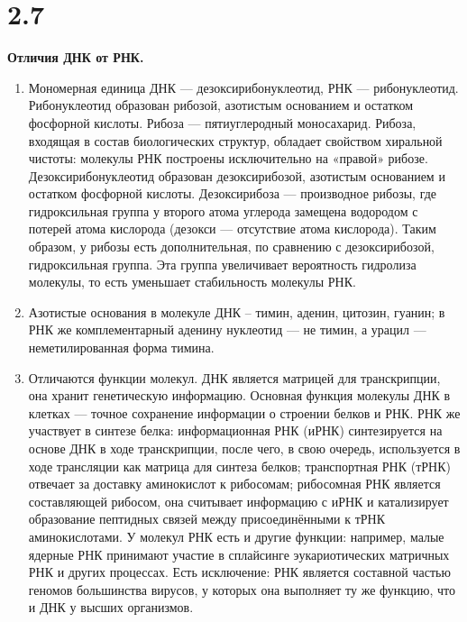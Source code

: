 \documentclass[a4paper,14pt]{article}
\begin{document}
\section*{2.7}

\begin{center}
	\LARGE{\textbf{Отличия ДНК от РНК.}}\\
\end{center}

\begin{enumerate}
\item Мономерная единица ДНК --- дезоксирибонуклеотид, РНК --- рибонуклеотид.
\newline
Рибонуклеотид образован рибозой, азотистым основанием и остатком фосфорной кислоты. Рибоза --- пятиуглеродный моносахарид. Рибоза, входящая в состав биологических структур, обладает свойством хиральной чистоты: молекулы РНК построены исключительно на «правой» рибозе.
\newline
Дезоксирибонуклеотид образован дезоксирибозой, азотистым основанием и остатком фосфорной кислоты. Дезоксирибоза --- производное рибозы, где гидроксильная группа у второго атома углерода замещена водородом с потерей атома кислорода (дезокси --- отсутствие атома кислорода).
\newline
Таким образом, у рибозы есть дополнительная, по сравнению с дезоксирибозой, гидроксильная группа. Эта группа увеличивает вероятность гидролиза молекулы, то есть уменьшает стабильность молекулы РНК.

\item Азотистые основания в молекуле ДНК – тимин, аденин, цитозин, гуанин; в РНК же комплементарный аденину нуклеотид --- не тимин, а урацил --- неметилированная форма тимина.

\item Отличаются функции молекул. ДНК является матрицей для транскрипции, она хранит генетическую информацию. Основная функция молекулы ДНК в клетках --- точное сохранение информации о строении белков и РНК. РНК же участвует в синтезе белка: информационная РНК (иРНК) синтезируется на основе ДНК в ходе транскрипции, после чего, в свою очередь, используется в ходе трансляции как матрица для синтеза белков; транспортная РНК (тРНК) отвечает за доставку аминокислот к рибосомам; рибосомная РНК является составляющей рибосом, она считывает информацию с иРНК и катализирует образование пептидных связей между присоединёнными к тРНК аминокислотами. У молекул РНК есть и другие функции: например, малые ядерные РНК принимают участие в сплайсинге эукариотических матричных РНК и других процессах. 
\newline
Есть исключение: РНК является составной частью геномов большинства вирусов, у которых она выполняет ту же функцию, что и ДНК у высших организмов.


\end{enumerate}
\end{document}
